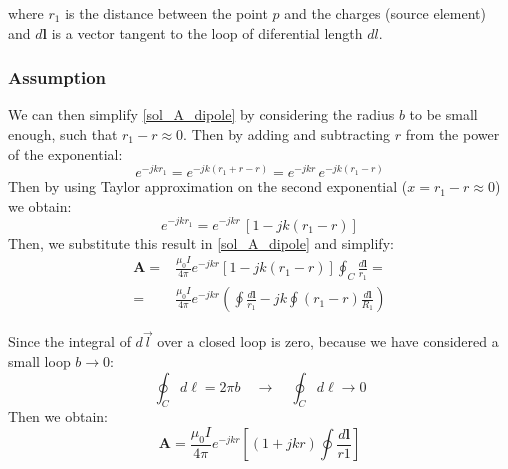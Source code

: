 where $r_1$ is the distance between the point $p$ and the charges (source element) and $d\mathbf{l}$ is a vector tangent to the loop of diferential length $dl$.

\subsubsection{Assumption} \label{Assumption}
We can then simplify \ref{sol_A_dipole} by considering the radius $b$ to be small enough, such that $r_1 - r \approx 0$. Then by adding and subtracting $r$ from the power of the exponential:
\[
e^{-j k r_1} = e^{-j k (r_1 + r - r)} = e^{-j k r} \, e^{-j k (r_1 - r)}
\]
Then by using Taylor approximation on the second exponential ($ x = r_1 - r \approx 0$) we obtain:
\[
e^{-j k r_1} = e^{-j k r}\, \left[ 1- j k (r_1 - r)\right]
\]
Then, we substitute this result in \ref{sol_A_dipole} and simplify:
\[
\begin{aligned}
\mathbf{A} =& \frac{\mu_0 I}{4 \pi} e^{-j k r} \left[ 1 - j k (r_1 - r) \right] \oint_C \frac{d\mathbf{l}}{r_1} = \\
=& \frac{\mu_0 I}{4 \pi} e^{-j k r} \left( \oint \frac{d\mathbf{l}}{r_1} - j k \oint (r_1 - r) \frac{d\mathbf{l}}{R_1} \right)
\end{aligned}
\]

Since the integral of \(d\vec{l}\) over a closed loop is zero, because we have considered a small loop $b \rightarrow 0$:
\[
\oint_C d\ell = 2\pi b \quad \rightarrow \quad \oint_C d\ell \rightarrow 0
\]
Then we obtain:
\begin{equation}
\mathbf{A} = \frac{\mu_0 I}{4 \pi} e^{-j k r} \left[ \left(1 + j k r \right) \oint \frac{d\mathbf{l}}{r1}\right]
\label{eq:sol_A_simp}
\end{equation}


